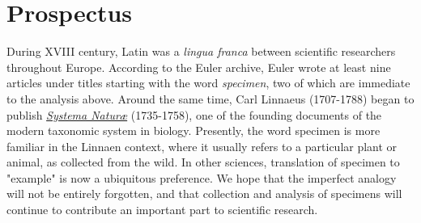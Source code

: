 \documentclass[nofootinbib,preprint]{revtex4-1}
\begin{document}
\section{Prospectus}
During XVIII century, Latin was a \textit{lingua franca} between scientific researchers 
throughout Europe. According to the Euler archive, Euler wrote at least nine articles 
under titles starting with the word \textit{specimen}, two of which are immediate 
to the analysis above. Around the same time, Carl Linnaeus (1707-1788) began to publish
\href{https://archive.org/details/CaroliLinnaeiSy00LinnA}{\textit{Systema Natur\ae}}
(1735-1758), one of the founding documents of the modern 
taxonomic system in biology. Presently, the word specimen is more familiar in the 
Linnaen context, where it usually refers to a particular plant or animal, 
as collected from the wild. In other sciences, translation of specimen to "example" 
is now a ubiquitous preference. We hope that the imperfect analogy will not be 
entirely forgotten, and that collection and analysis of specimens will 
continue to contribute an important part to scientific research. 
\end{document}
